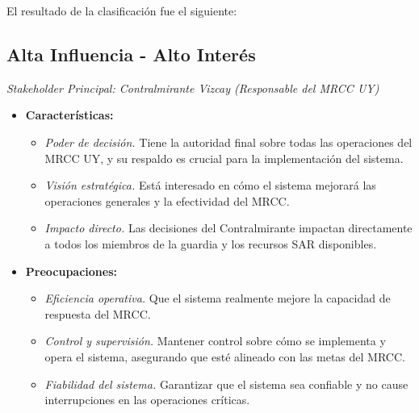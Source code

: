 El resultado de la clasificación fue el siguiente:

\subsection{Alta Influencia - Alto Interés} 
\textit{Stakeholder Principal: Contralmirante Vizcay (Responsable del MRCC UY)}
\begin{itemize}
    \item \textbf{Características:}
    \begin{itemize}
        \item \textit{Poder de decisión.} Tiene la autoridad final sobre todas las operaciones del MRCC UY, y su respaldo es crucial para la 
        implementación del sistema.
        \item \textit{Visión estratégica.} Está interesado en cómo el sistema mejorará las operaciones generales y la efectividad del MRCC.
        \item \textit{Impacto directo.} Las decisiones del Contralmirante impactan directamente a todos los miembros de la guardia y los recursos 
        SAR disponibles.
    \end{itemize}
    \item \textbf{Preocupaciones:}
    \begin{itemize}
        \item \textit{Eficiencia operativa.} Que el sistema realmente mejore la capacidad de respuesta del MRCC.
        \item \textit{Control y supervisión.} Mantener control sobre cómo se implementa y opera el sistema, asegurando que esté alineado con las 
        metas del MRCC.
        \item \textit{Fiabilidad del sistema.} Garantizar que el sistema sea confiable y no cause interrupciones en las operaciones críticas.
    \end{itemize}
\end{itemize}



